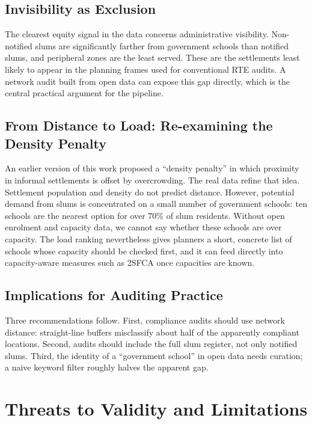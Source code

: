 \documentclass[conference]{IEEEtran}
\begin{document}
\subsection{Invisibility as Exclusion}
The clearest equity signal in the data concerns administrative visibility. Non-notified slums are significantly farther from government schools than notified slums, and peripheral zones are the least served. These are the settlements least likely to appear in the planning frames used for conventional RTE audits. A network audit built from open data can expose this gap directly, which is the central practical argument for the pipeline.

\subsection{From Distance to Load: Re-examining the Density Penalty}
An earlier version of this work proposed a ``density penalty'' in which proximity in informal settlements is offset by overcrowding. The real data refine that idea. Settlement population and density do not predict distance. However, potential demand from slums is concentrated on a small number of government schools: ten schools are the nearest option for over 70\% of slum residents. Without open enrolment and capacity data, we cannot say whether these schools are over capacity. The load ranking nevertheless gives planners a short, concrete list of schools whose capacity should be checked first, and it can feed directly into capacity-aware measures such as 2SFCA \cite{luo2003} once capacities are known.

\subsection{Implications for Auditing Practice}
Three recommendations follow. First, compliance audits should use network distance: straight-line buffers misclassify about half of the apparently compliant locations. Second, audits should include the full slum register, not only notified slums. Third, the identity of a ``government school'' in open data needs curation; a naive keyword filter roughly halves the apparent gap.

\section{Threats to Validity and Limitations}\label{sec:validity}
\end{document}
